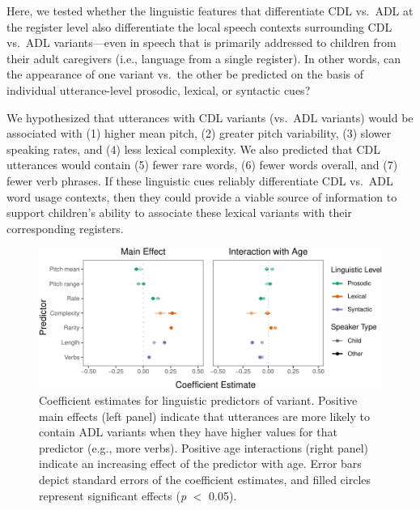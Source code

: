 \documentclass[10pt, letterpaper]{article}
\newenvironment{CodeChunk}{}{}
\begin{document}
Here, we tested whether the linguistic features that differentiate CDL
vs.~ADL at the register level also differentiate the local speech
contexts surrounding CDL vs.~ADL variants---even in speech that is
primarily addressed to children from their adult caregivers (i.e.,
language from a single register). In other words, can the appearance of
one variant vs.~the other be predicted on the basis of individual
utterance-level prosodic, lexical, or syntactic cues?

We hypothesized that utterances with CDL variants (vs.~ADL variants)
would be associated with (1) higher mean pitch, (2) greater pitch
variability, (3) slower speaking rates, and (4) less lexical complexity.
We also predicted that CDL utterances would contain (5) fewer rare
words, (6) fewer words overall, and (7) fewer verb phrases. If these
linguistic cues reliably differentiate CDL vs.~ADL word usage contexts,
then they could provide a viable source of information to support
children's ability to associate these lexical variants with their
corresponding registers.

\begin{CodeChunk}
\begin{figure}[h]

{\centering \includegraphics{figs/ling-predictors-fig-1} 

}

\caption[Coefficient estimates for linguistic predictors of variant]{Coefficient estimates for linguistic predictors of variant. Positive main effects (left panel) indicate that utterances are more likely to contain ADL variants when they have higher values for that predictor (e.g., more verbs). Positive age interactions (right panel) indicate an increasing effect of the predictor with age. Error bars depict standard errors of the coefficient estimates, and filled circles represent significant effects (\textit{p} $<$ 0.05).}\label{fig:ling-predictors-fig}
\end{figure}
\end{CodeChunk}
\end{document}

